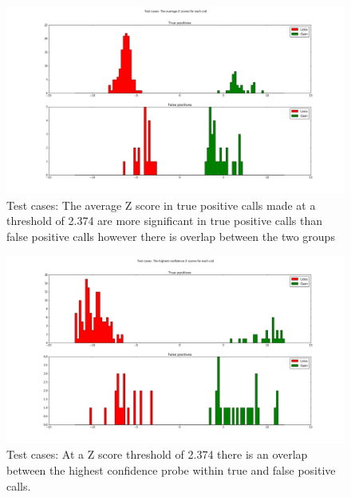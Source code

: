 \begin{figure}
\centering
\includegraphics[width=1\linewidth]{./Figures/testcasesaverageconfidenceZscore}
\caption[Test cases: The average Z score at a threshold of 2.374]{Test cases: The average Z score in true positive calls made at a threshold of 2.374 are more significant in true positive calls than false positive calls however there is overlap between the two groups}
\label{fig:testcasesaverageconfidenceZscore}
\end{figure}

\begin{figure}
\centering
\includegraphics[width=1\linewidth]{./Figures/testcaseshighestconfidenceZscore}
\caption[Test cases: The highest confidence probe within calls made at a threshold of 2.374]{Test cases: At a Z score threshold of 2.374 there is an overlap between the highest confidence probe within true and false positive calls.}
\label{fig:testcaseshighestconfidenceZscore}
\end{figure}

